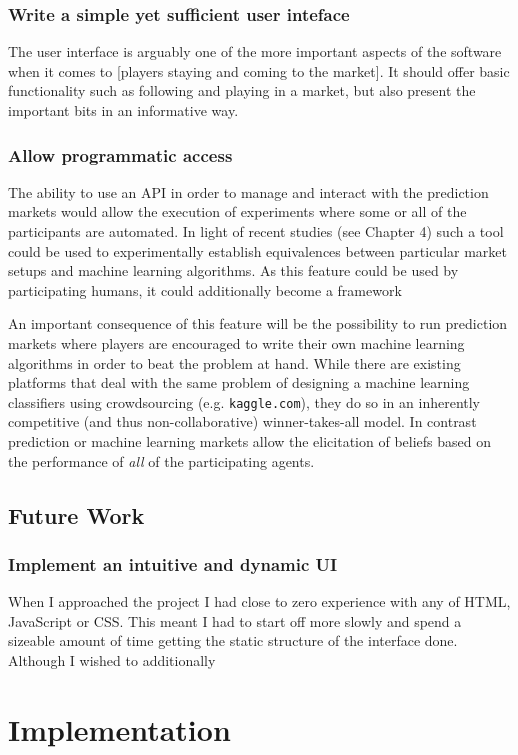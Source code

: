 \documentclass[bsc,frontabs,twoside,singlespacing,parskip,deptreport]{infthesis}     %
\begin{document}
\subsection{Write a simple yet sufficient user inteface}
	The user interface is arguably one of the more important aspects of the software when it comes to [players staying and coming to the market]. It should offer basic functionality such as following and playing in a market, but also present the important bits in an informative way. 
	

\subsection{Allow programmatic access}
	The ability to use an API in order to manage and interact with the prediction markets would allow the execution of experiments where some or all of the participants are automated. In light of recent studies (see Chapter 4) such a tool could be used to experimentally establish equivalences between particular market setups and machine learning algorithms. As this feature could be used by participating humans, it could additionally become a framework 

	An important consequence of this feature will be the possibility to run prediction markets where players are encouraged to write their own machine learning algorithms in order to beat the problem at hand. While there are existing platforms that deal with the same problem of designing a machine learning classifiers using crowdsourcing (e.g. {\tt kaggle.com}), they do so in an inherently competitive (and thus non-collaborative) winner-takes-all model. In contrast prediction or machine learning markets allow the elicitation of beliefs based on the performance of {\em all} of the participating agents. 

\section{Future Work}
\subsection{Implement an intuitive and dynamic UI}
	When I approached the project I had close to zero experience with any of HTML, JavaScript or CSS. This meant I had to start off more slowly and spend a sizeable amount of time getting the static structure of the interface done. Although I wished to additionally 

\chapter{Implementation}
\end{document}
